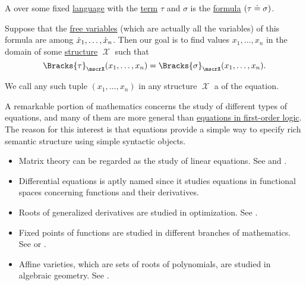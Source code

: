 \begin{definition}\label{def:first_order_equation}\mimprovised
  A  over some fixed \hyperref[def:first_order_language]{language} with  the \hyperref[def:first_order_syntax/term]{term} \( \tau \) and  \( \sigma \) is the \hyperref[def:first_order_syntax/formula]{formula} \( (\tau \doteq \sigma) \).

  Suppose that the \hyperref[def:first_order_syntax/formula_free_variables]{free variables} (which are actually all the variables) of this formula are among \( {\dot{x}}_1, \ldots, {\dot{x}}_n \). Then our goal is to find values \( x_1, \ldots, x_n \) in the domain of some \hyperref[def:first_order_structure]{structure} \( \mscrX \) such that
  \begin{equation*}
    \Bracks{\tau}_\mscrX(x_1, \ldots, x_n) = \Bracks{\sigma}_\mscrX(x_1, \ldots, x_n).
  \end{equation*}

  We call any such tuple \( (x_1, \ldots, x_n) \) in any structure \( \mscrX \) a  of the equation.
\end{definition}

\begin{example}\label{ex:equations}
  A remarkable portion of mathematics concerns the study of different types of equations, and many of them are more general than \hyperref[def:first_order_equation]{equations in first-order logic}. The reason for this interest is that equations provide a simple way to specify rich semantic structure using simple syntactic objects.

  \begin{itemize}
    \item Matrix theory can be regarded as the study of linear equations. See  and .
    \item Differential equations is aptly named since it studies equations in functional spaces concerning functions and their derivatives.
    \item Roots of generalized derivatives are studied in optimization. See .
    \item Fixed points of functions are studied in different branches of mathematics. See  or .
    \item Affine varieties, which are sets of roots of polynomials, are studied in algebraic geometry. See .
  \end{itemize}
\end{example}

